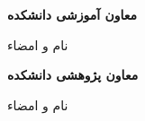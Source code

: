 \vspace{0.35cm}

\noindent
\begin{minipage}[t]{0.49\linewidth}
  \centering
  \bfseries
معاون آموزشی دانشکده\par
نام و امضاء
\end{minipage}\hfill
\begin{minipage}[t]{0.49\linewidth}
\centering
\bfseries
معاون پژوهشی دانشکده\par
نام و امضاء
\end{minipage}

\clearpage
